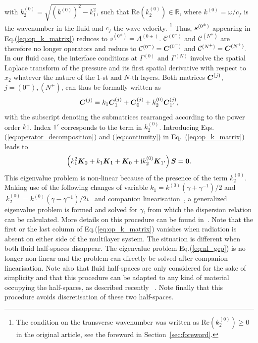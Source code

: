 with $ k_{2}^{(0)}=\sqrt{\left(k^{(0)}\right)^2- k_1^2}$, such that $\textrm{Re}\left( k_{2}^{(0)}\right)\in \mathbb R$, where $k^{(0)} = \omega /c_f$ is the wavenumber in the fluid and $c_f$ the wave velocity. \footnote{The condition on the transverse wavenumber was written as $\textrm{Re}\left( k_{2}^{(0)}\right)\geq 0$ in the original article, see the foreword in Section~\ref{sec:foreword}.} Thus, $\boldsymbol s^{(0^\pm)}$ appearing in  Eq.(\ref{eq:op_k_matrix}) reduces to $s^{(0^\pm)}=A^{(0\pm)}$. $\mathcal{C}^{(0^-)}$ and $\mathcal{C}^{(N^+)}$ are therefore no longer operators and reduce to $\mathcal{C}^{(0^-)}= \boldsymbol C^{(0^-)}$ and $\mathcal{C}^{(N^+)}=\boldsymbol C^{(N^+)}$. In our fluid case, the interface conditions at $\Gamma^{(0)}$ and $\Gamma^{(N)}$ involve the spatial Laplace transform of the pressure and its first spatial derivative with respect to $x_2$ whatever the nature of the $1$-st and $N$-th layers.  Both matrices $ \boldsymbol C^{(j)}$, $j=(0^-),(N^+)$, can thus be formally written as
    \begin{equation}
        \boldsymbol C^{(j)} = k_1 \boldsymbol C_1^{(j)}+\boldsymbol C_0^{(j)}+k_2^{(0)}\boldsymbol C_{1'}^{(j)},
        \label{eq:continuity}
    \end{equation}
with the subscript denoting the submatrices rearranged according to the power order $k1$. Index $1'$ corresponds to the term in $k_2^{(0)}$. Introducing Eqs.(\ref{eq:operator_decomposition}) and (\ref{eq:continuity}) in Eq.~(\ref{eq:op_k_matrix}) leads to
    \begin{equation}
       \left(  k_1^2 \boldsymbol K_2 +  k_1 \boldsymbol K_1 + \boldsymbol K_0 + \mathrm i k_2^{(0)} \boldsymbol K_{1'} \right) \boldsymbol S = \boldsymbol 0.
       \label{eq:nl_gep}
    \end{equation}
This eigenvalue problem is non-linear because of the presence of the term $k_2^{(0)}$. Making use of the following changes of variable $ k_1 = k^{(0)} \left(\gamma + \gamma^{-1} \right)/2$ and $\ k_2^{(0)}= k^{(0)} \left(\gamma - \gamma^{-1} \right)/2i$~\cite{hood2017, betcke2013} and companion linearisation~\cite{gohberg2009}, a generalized eigenvalue problem is formed and solved for $\gamma$, from which the dispersion relation can be calculated. More details on this procedure can be found in~\cite{kiefer2019}. 
Note that the first or the last column of Eq.(\ref{eq:op_k_matrix}) vanishes when radiation is absent on either side of the multilayer system. The situation is different when both fluid half-spaces disappear. The eigenvalue problem Eq.(\ref{eq:nl_gep}) is no longer non-linear and the problem can directly be solved after companion linearisation. Note also that fluid half-spaces are only considered for the sake of simplicity and that this procedure can be adapted to any kind of material occupying the half-spaces, as described recently ~\cite{gravenkamp2024}. Note finally that this procedure avoids discretisation of these two half-spaces.\\
    
